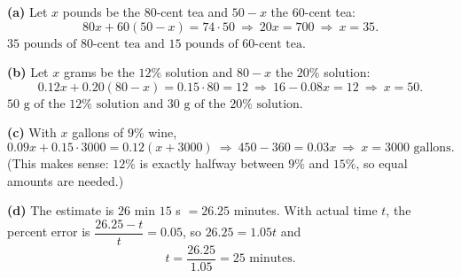 \textbf{(a)} Let $x$ pounds be the $80$-cent tea and $50-x$ the $60$-cent tea:
\[
80x+60(50-x)=74\cdot50\ \Longrightarrow\ 20x=700\ \Longrightarrow\ x=35 .
\]
$\boxed{35\text{ pounds of }80\text{-cent tea and }15\text{ pounds of }60\text{-cent tea}}$.

\textbf{(b)} Let $x$ grams be the $12\%$ solution and $80-x$ the $20\%$ solution:
\[
0.12x+0.20(80-x)=0.15\cdot80=12\ \Longrightarrow\ 16-0.08x=12\ \Longrightarrow\ x=50 .
\]
$\boxed{50\text{ g of the }12\%\text{ solution and }30\text{ g of the }20\%\text{ solution}}$.

\textbf{(c)} With $x$ gallons of $9\%$ wine,
\[
0.09x+0.15\cdot3000=0.12(x+3000)\ \Longrightarrow\ 450-360=0.03x\ \Longrightarrow\ x=\boxed{3000\text{ gallons}} .
\]
(This makes sense: $12\%$ is exactly halfway between $9\%$ and $15\%$, so equal amounts are needed.)

\textbf{(d)} The estimate is $26$ min $15$ s $=26.25$ minutes. With actual time $t$, the percent error is $\dfrac{26.25-t}{t}=0.05$, so $26.25=1.05t$ and
\[
t=\dfrac{26.25}{1.05}=\boxed{25\text{ minutes}} .
\]
